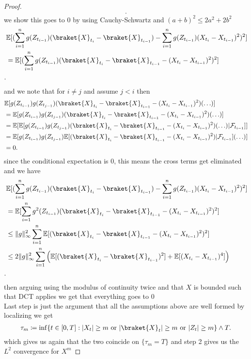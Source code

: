 \begin{proof}
\begin{align*}
.\end{align*}
we show this goes to $0$ by using Cauchy-Schwartz and $(a+b)^2 \le 2a^2+2b^2$
\begin{align*}
  &\E[(\sum_{i=1}^{n}g(Z_{t_{i-1}}) (\braket{X}_{t_i} - \braket{X}_{t_{i-1}}) - \sum_{i=1}^{n}g(Z_{t_{i-1}}) (X_{t_i} -X_{t_{i-1}})^2)^2]\\
  &= \E[(\sum_{i=1}^{n}g(Z_{t_{i-1}}) (\braket{X}_{t_i} - \braket{X}_{t_{i-1}}-(X_{t_i} -X_{t_{i-1}})^2)^2]\\
.\end{align*}
and we note that for $i\neq j$ and assume $j<i$ then
\begin{align*}
  &\E[g(Z_{t_{i-1}})g(Z_{t_{j-1}})(\braket{X}_{t_i} - \braket{X}_{t_{i-1}}-(X_{t_i} -X_{t_{i-1}})^2)(\ldots )]\\
  &=\E[g(Z_{t_{i-1}})g(Z_{t_{j-1}})(\braket{X}_{t_i} - \braket{X}_{t_{i-1}}-(X_{t_i} -X_{t_{i-1}})^2)(\ldots )]\\ 
  &= \E[\E[g(Z_{t_{i-1}})g(Z_{t_{j-1}})(\braket{X}_{t_i} - \braket{X}_{t_{i-1}}-(X_{t_i} -X_{t_{i-1}})^2)(\ldots )|\mathcal{F}_{t_{i-1}}]]\\ 
  &= \E[ g(Z_{t_{i-1}})g(Z_{t_{j-1}})\E[(\braket{X}_{t_i} - \braket{X}_{t_{i-1}}-(X_{t_i} -X_{t_{i-1}})^2)|\mathcal{F}_{t_{i-1}}](\ldots )]\\ 
  &= 0
.\end{align*}
since the conditional expectation is 0, this means the cross terms get eliminated and we have 
\begin{align*}
  &\E[(\sum_{i=1}^{n}g(Z_{t_{i-1}}) (\braket{X}_{t_i} - \braket{X}_{t_{i-1}}) - \sum_{i=1}^{n}g(Z_{t_{i-1}}) (X_{t_i} -X_{t_{i-1}})^2)^2]\\
  &= \E[\sum_{i=1}^{n}g^2(Z_{t_{i-1}}) (\braket{X}_{t_i} - \braket{X}_{t_{i-1}}-(X_{t_i} -X_{t_{i-1}})^2)^2]\\
  &\le \|g\|^2_{\infty} \sum_{i=1}^{n}\E[(\braket{X}_{t_i} - \braket{X}_{t_{i-1}}-(X_{t_i} -X_{t_{i-1}})^2)^2]\\
  &\le 2\|g\|^2_{\infty} \sum_{i=1}^{n}\left(  \E[(\braket{X}_{t_i} - \braket{X}_{t_{i-1}})^2]+\E[(X_{t_i} -X_{t_{i-1}})^4]\right) \\
.\end{align*}
then arguing using the modulus of continuity twice and that $X$ is bounded such that DCT applies we get that everything goes to 0\\
Last step is just the argument that all the assumptions above are well formed by localizing we  get
\begin{align*}
  \tau_m \coloneqq  \inf \{t \in [0,T] : \abs{X_t}\ge m \text{ or } \abs{\braket{X}_t} \ge  m \text{ or } \abs{Z_t} \ge m\}  \land T
.\end{align*}
which gives us again that the two coincide on $\{\tau_m = T\}  $ and step 2 gives us the $L^2$ convergence for $X^{m} $
\end{proof}
